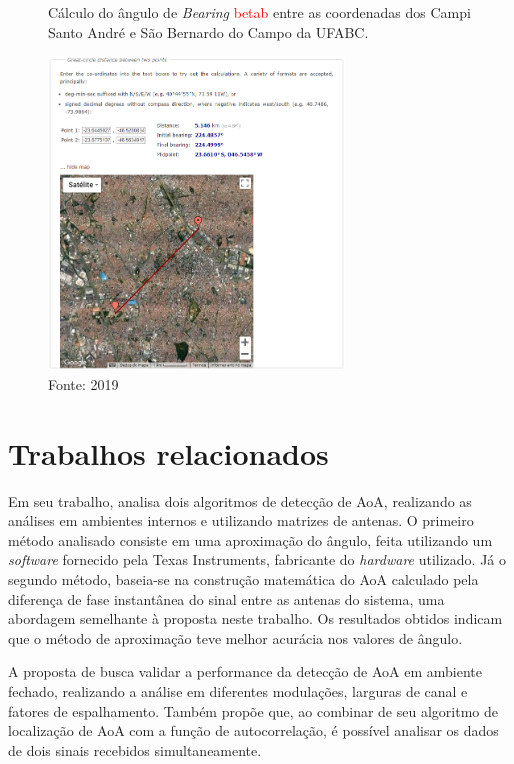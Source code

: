 \begin{figure}[htbp]
    \centering
    \caption{Cálculo do ângulo de \textit{Bearing} \textcolor{Red}{\ac{betab}} entre as coordenadas dos Campi Santo André e São Bernardo do Campo da UFABC.}
    \includegraphics[width=0.7\textwidth]{../pictures/bearing.png}
    \caption*{Fonte: \citeauthor{chrisveness} 2019 \cite{chrisveness}}
    \label{fig:bearing}
\end{figure}



\section{Trabalhos relacionados}

Em seu trabalho, \citeauthor{horst2021localization} \cite{horst2021localization} analisa dois algoritmos de detecção de \ac{AoA}, realizando as análises em ambientes internos e utilizando matrizes de antenas.
O primeiro método analisado consiste em uma aproximação do ângulo, feita utilizando um \textit{software} fornecido pela Texas Instruments, fabricante do \textit{hardware} utilizado.
Já o segundo método, baseia-se na construção matemática do \ac{AoA} calculado pela diferença de fase instantânea do sinal entre as antenas do sistema, uma abordagem semelhante à proposta neste trabalho.
Os resultados obtidos indicam que o método de aproximação teve melhor acurácia nos valores de ângulo.

A proposta de \citeauthor{zeaiter:hal-03693641} \cite{zeaiter:hal-03693641} busca validar a performance da detecção de \ac{AoA} em ambiente fechado, realizando a análise em diferentes modulações, larguras de canal e fatores de espalhamento.
Também propõe que, ao combinar de seu algoritmo de localização de \ac{AoA} com a função de autocorrelação, é possível analisar os dados de dois sinais recebidos simultaneamente.

